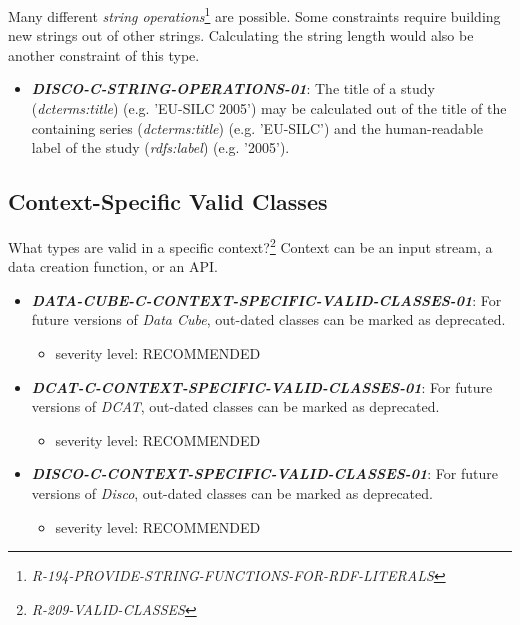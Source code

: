 \documentclass{llncs}
\begin{document}
Many different \emph{string operations}\footnote{\emph{R-194-PROVIDE-STRING-FUNCTIONS-FOR-RDF-LITERALS}} are possible.
Some constraints require building new strings out of other strings.
Calculating the string length would also be another constraint of this type.

\begin{itemize}
	\item \textbf{{\em DISCO-C-STRING-OPERATIONS-01}}: The title of a study (\emph{dcterms:title}) (e.g. 'EU-SILC 2005') may be calculated out of the title of the containing series (\emph{dcterms:title}) (e.g. 'EU-SILC') and the human-readable label of the study (\emph{rdfs:label}) (e.g. '2005').   
\end{itemize}

\subsection{Context-Specific Valid Classes}

What types are valid in a specific context?\footnote{\emph{R-209-VALID-CLASSES}} 
Context can be an input stream, a data creation function, or an API.

\begin{itemize}
	\item \textbf{{\em DATA-CUBE-C-CONTEXT-SPECIFIC-VALID-CLASSES-01}}: For future versions of \emph{Data Cube}, out-dated classes can be marked as deprecated.
	\begin{itemize}
		\item severity level: RECOMMENDED
	\end{itemize}
\end{itemize}

\begin{itemize}
	\item \textbf{{\em DCAT-C-CONTEXT-SPECIFIC-VALID-CLASSES-01}}: For future versions of \emph{DCAT}, out-dated classes can be marked as deprecated.
	\begin{itemize}
		\item severity level: RECOMMENDED
	\end{itemize}
\end{itemize}

\begin{itemize}
	\item \textbf{{\em DISCO-C-CONTEXT-SPECIFIC-VALID-CLASSES-01}}: For future versions of \emph{Disco}, out-dated classes can be marked as deprecated.
	\begin{itemize}
		\item severity level: RECOMMENDED
	\end{itemize}
\end{itemize}
\end{document}
